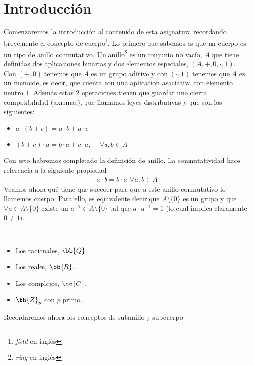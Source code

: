 \chapter*{Introducción}

Comenzaremos la introducción al contenido de esta asignatura recordando brevemente el concepto de cuerpo\footnote{\textit{field} en inglés}. Lo primero que sabemos es que un cuerpo es un tipo de anillo conmutativo. Un anillo\footnote{\textit{ring} en inglés} es un conjunto no vacío, $A$ que tiene definidas dos aplicaciones binarias y dos elementos especiales, $(A, +, 0, \cdot, 1)$. Con $(+,0)$ tenemos que $A$ es un grupo aditivo y con $(\cdot, 1)$ tenemos que $A$ es un monoide, es decir, que cuenta con una aplicación asociativa con elemento neutro $1$. Además estas 2 operaciones tienen que guardar una cierta compatibilidad (axiomas), que llamamos leyes distributivas y que son los siguientes:
\begin{itemize}
    \item $a\cdot(b+c) = a\cdot b + a \cdot c$
    \item $(b+c)\cdot a = b\cdot a + c \cdot a$, \ \ $\forall a,b\in A$
\end{itemize}
Con esto habremos completado la definición de anillo. La conmutatividad hace referencia a la siguiente propiedad:
\begin{gather*}
    a\cdot b = b \cdot a  \ \ \forall a,b\in A
\end{gather*}
Veamos ahora qué tiene que suceder para que a este anillo conmutativo lo llamemos cuerpo. Para ello, es equivalente decir que $A\setminus \{0\}$ es un grupo y que $\forall a \in A\setminus\{0\}$ existe un $a^{-1}\in A\setminus \{0\}$ tal que $a\cdot a^{-1} = 1$ (lo cual implica claramente $0\neq 1$).

\begin{ejemplo}\
    \begin{itemize}
        \item Los racionales, $\bb{Q}$.
        \item Los reales, $\bb{R}$.
        \item Los complejos, $\cc{C}$.
        \item $\bb{Z}_p$ con $p$ primo.
    \end{itemize}
\end{ejemplo}

Recordaremos ahora los conceptos de subanillo y subcuerpo
